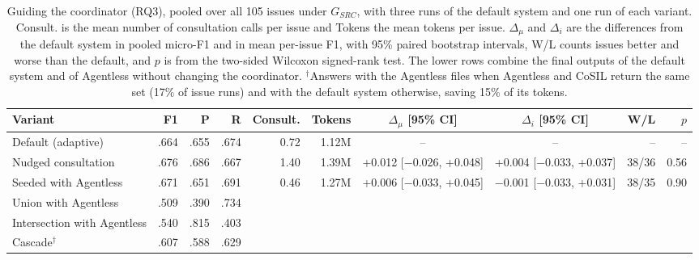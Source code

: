 \begin{table}[t]
\centering
\caption{Guiding the coordinator (RQ3), pooled over all 105 issues under $G_{SRC}$, with three runs of the default system and one run of each variant. Consult. is the mean number of consultation calls per issue and Tokens the mean tokens per issue. $\Delta_{\mu}$ and $\Delta_{i}$ are the differences from the default system in pooled micro-F1 and in mean per-issue F1, with 95\% paired bootstrap intervals, W/L counts issues better and worse than the default, and $p$ is from the two-sided Wilcoxon signed-rank test. The lower rows combine the final outputs of the default system and of Agentless without changing the coordinator. $^\dagger$Answers with the Agentless files when Agentless and CoSIL return the same set (17\% of issue runs) and with the default system otherwise, saving 15\% of its tokens.}
\label{tab:guidance}
\small
\setlength{\tabcolsep}{3.5pt}
\begin{tabular}{lrrrrrccrr}
\toprule
Variant & F1 & P & R & Consult. & Tokens & $\Delta_{\mu}$ [95\% CI] & $\Delta_{i}$ [95\% CI] & W/L & $p$ \\
\midrule
Default (adaptive) & .664 & .655 & .674 & 0.72 & 1.12M & -- & -- & -- & -- \\
Nudged consultation & .676 & .686 & .667 & 1.40 & 1.39M & +0.012 [$-$0.026, +0.048] & +0.004 [$-$0.033, +0.037] & 38/36 & 0.56 \\
Seeded with Agentless & .671 & .651 & .691 & 0.46 & 1.27M & +0.006 [$-$0.033, +0.045] & $-$0.001 [$-$0.033, +0.031] & 38/35 & 0.90 \\
\midrule
Union with Agentless & .509 & .390 & .734 & & & & & & \\
Intersection with Agentless & .540 & .815 & .403 & & & & & & \\
Cascade$^\dagger$ & .607 & .588 & .629 & & & & & & \\
\bottomrule
\end{tabular}
\end{table}
